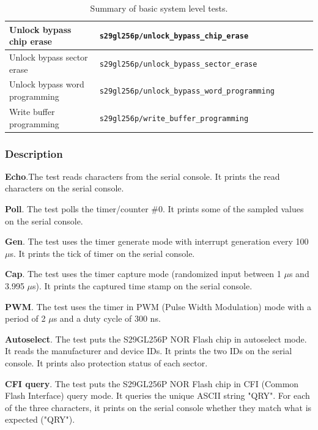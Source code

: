 \begin{table}[h]
\begin{center}
\begin{tabular}{|l|l|l|l|l|l|}
		\hline
		Unlock bypass chip erase &
		\texttt{\footnotesize s29gl256p/unlock\_bypass\_chip\_erase} &
		\X &
		   &
		\X &
		\X \\
		\hline
		Unlock bypass sector erase &
		\texttt{\footnotesize s29gl256p/unlock\_bypass\_sector\_erase} &
		\X &
		   &
		\X &
		\X \\
		\hline
		Unlock bypass word programming &
		\texttt{\footnotesize s29gl256p/unlock\_bypass\_word\_programming} &
		\X &
		   &
		\X &
		\X \\
		\hline
		Write buffer programming &
		\texttt{\footnotesize s29gl256p/write\_buffer\_programming} &
		\X &
		   &
		\X &
		\X \\
		\hline
		\end{tabular}
	\end{center}
	\caption{Summary of basic system level tests.}
	\label{table:basic_system_test_summary}
\end{table}

\subsubsection{Description}

\noindent \textbf{Echo}.The test reads characters from the serial console.
It prints the read characters on the serial console.

\noindent \textbf{Poll}. The test polls the timer/counter \#0.
It prints some of the sampled values on the serial console.

\noindent \textbf{Gen}. The test uses the timer generate mode with interrupt generation every 100 $\mu$s.
It prints the tick of timer on the serial console.

\noindent \textbf{Cap}. The test uses the timer capture mode (randomized input between 1 $\mu$s and 3.995 $\mu$s).
It prints the captured time stamp on the serial console.

\noindent \textbf{PWM}. The test uses the timer in PWM (Pulse Width Modulation) mode with a period of 2 $\mu$s and a duty cycle of 300 ns.

\noindent \textbf{Autoselect}. The test puts the S29GL256P NOR Flash chip in autoselect mode.
It reads the manufacturer and device IDs.
It prints the two IDs on the serial console.
It prints also protection status of each sector.

\noindent \textbf{CFI query}. The test puts the S29GL256P NOR Flash chip in CFI (Common Flash Interface) query mode.
It queries the unique ASCII string "QRY".
For each of the three characters, it prints on the serial console whether they match what is expected ("QRY").


